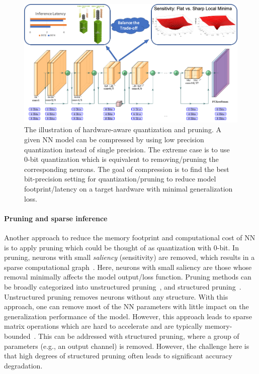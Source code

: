 \begin{figure}
\centering
\includegraphics[width=0.8\linewidth]{figures/pruning_quantization_illustration_nologo.png}
\caption{The illustration of hardware-aware quantization and pruning. 
A given NN model can be compressed by using low precision quantization instead
of single precision. The extreme case is to use 0-bit quantization which is 
equivalent to removing/pruning the corresponding neurons.
The goal of compression is to find the best bit-precision setting for
quantization/pruning to reduce model footprint/latency on a target hardware
with minimal generalization loss.
}
\label{fig:pruning_quantization}
\end{figure}

\paragraph{Pruning and sparse inference}

Another approach to reduce the memory footprint and computational cost of NN is to apply
pruning which could be thought of as quantization with 0-bit. In pruning, neurons with small \emph{saliency} (sensitivity) are removed, which results in a sparse computational graph~\cite{lecun1990optimal}. 
Here, neurons with small saliency are those whose removal minimally affects the model output/loss function.
Pruning methods can be broadly categorized into unstructured pruning~\cite{lecun1990optimal,hassibi1993second,dong2017learning, lee2018snip, xiao2019autoprune, park2020lookahead}, and structured pruning~\cite{luo2017thinet, he2018amc, yu2018nisp, lin2018accelerating, huang2018data, zhao2019variational}.
Unstructured pruning removes neurons without any structure.
With this approach, one can remove most of the NN parameters with little impact on the
generalization performance of the model.
However, this approach leads to sparse matrix operations which are hard to accelerate 
and are typically memory-bounded~\cite{buluc2008challenges,gale2019state,hoefler2021sparsity,blalock2020state}.
This can be addressed with structured pruning, where a
group of parameters (e.g., an output channel) is removed. However, the challenge here is that high degrees of structured
pruning often leads to significant accuracy degradation.


